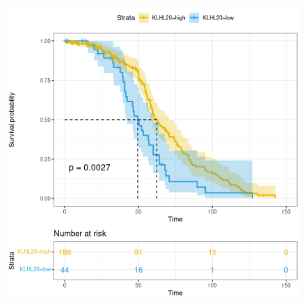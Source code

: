 \documentclass[fleqn,10pt]{SelfArx} %
\begin{document}
\begin{figure}[ht]
\begin{multicols}{2}
	 			\includegraphics[width=0.7\linewidth]{figures/KLHL20.png}

				\columnbreak


\end{multicols}
\end{figure}
\end{document}
